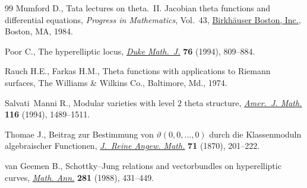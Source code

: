 \documentclass[11pt]{article}
\numberwithin{equation}{section}
\numberwithin{equation}{section}
\begin{document}
\begin{thebibliography}{99}
Mumford D., Tata lectures on theta.~{II}. Jacobian theta functions and
 differential equations, \textit{Progress in Mathematics}, Vol.~43,
 \href{https://doi.org/10.1007/978-0-8176-4578-6}{Birkh\"{a}user Boston, Inc.}, Boston, MA, 1984.

Poor C., The hyperelliptic locus, \href{https://doi.org/10.1215/S0012-7094-94-07634-5}{\textit{Duke Math.~J.}} \textbf{76} (1994), 809--884.

Rauch H.E., Farkas H.M., Theta functions with applications to {R}iemann
 surfaces, The Williams \& Wilkins Co., Baltimore, Md., 1974.

Salvati~Manni R., Modular varieties with level {$2$} theta structure,
 \href{https://doi.org/10.2307/2375056}{\textit{Amer.~J. Math.}} \textbf{116} (1994), 1489--1511.

Thomae J., Beitrag zur {B}estimmung von {$\vartheta(0,0,\dots, 0)$} durch die
 {K}lassenmoduln algebraischer {F}unctionen, \href{https://doi.org/10.1515/crll.1870.71.201}{\textit{J.~Reine Angew. Math.}}
 \textbf{71} (1870), 201--222.

van Geemen B., Schottky--{J}ung relations and vectorbundles on hyperelliptic
 curves, \href{https://doi.org/10.1007/BF01457155}{\textit{Math. Ann.}} \textbf{281} (1988), 431--449.

\end{thebibliography}
\end{document}

